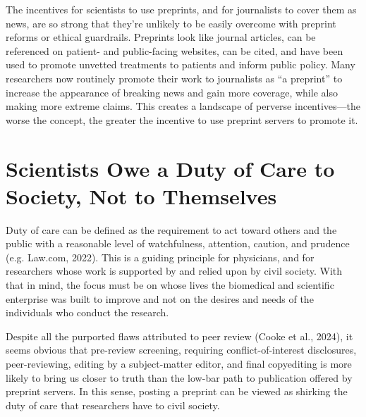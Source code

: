 \documentclass[authordate, perspective, issue]{jote-new-article}
\begin{document}
	The incentives for scientists to use preprints, and for journalists to cover them as news, are so strong that they're unlikely to be easily overcome with preprint reforms or ethical guardrails. Preprints look like journal articles, can be referenced on patient- and public-facing websites, can be cited, and have been used to promote unvetted treatments to patients and inform public policy. Many researchers now routinely promote their work to journalists as “a preprint” to increase the appearance of breaking news and gain more coverage, while also making more extreme claims. This creates a landscape of perverse incentives—the worse the concept, the greater the incentive to use preprint servers to promote it.







	\section{Scientists Owe a Duty of Care to Society, Not to Themselves}







	Duty of care can be defined as the requirement to act toward others and the public with a reasonable level of watchfulness, attention, caution, and prudence (e.g. Law.com, 2022). This is a guiding principle for physicians, and for researchers whose work is supported by and relied upon by civil society. With that in mind, the focus must be on whose lives the biomedical and scientific enterprise was built to improve and not on the desires and needs of the individuals who conduct the research.







	Despite all the purported flaws attributed to peer review (Cooke et al., 2024), it seems obvious that pre-review screening, requiring conflict-of-interest disclosures, peer-reviewing, editing by a subject-matter editor, and final copyediting is more likely to bring us closer to truth than the low-bar path to publication offered by preprint servers. In this sense, posting a preprint can be viewed as shirking the duty of care that researchers have to civil society.
\end{document}
